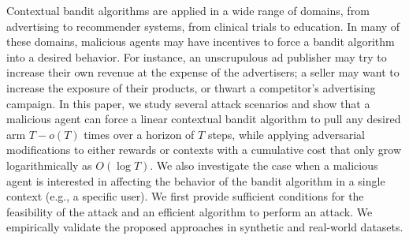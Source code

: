 \newcommand{\mtb}[1]{\textcolor{black}{#1}}
\newcommand{\otc}[1]{\textcolor{black}{#1}}
\newcommand{\changede}[1]{\textcolor{black}{#1}}
\newcommand{\changebr}[1]{\textcolor{black}{#1}}
\newcommand{\changelm}[1]{\textcolor{black}{#1}}
\newcommand{\changebrtwo}[1]{\textcolor{black}{#1}}
\newcommand{\changee}[1]{\textcolor{black}{#1}}
\newcommand{\cmmnt}[1]{\ignorespaces}


Contextual bandit algorithms are applied in a wide range of domains, from advertising to recommender systems, from clinical trials to education. In many of these domains, malicious agents may have incentives to {force a bandit algorithm into a desired behavior.} %
For instance, an unscrupulous ad publisher may try to increase their own revenue at the expense of the advertisers; a seller may want to increase the exposure of their products, or thwart a competitor's advertising campaign.
In this paper, we study several attack scenarios and show that a malicious agent can force a linear contextual bandit algorithm to pull any desired arm $T - o(T)$ times over a horizon of $T$ steps, while applying adversarial modifications to either rewards or contexts {with a cumulative cost} that only grow logarithmically as $O(\log T)$.
We also investigate the case when a malicious agent is interested in affecting the behavior of the bandit algorithm in a single context (e.g., a specific user). We first provide sufficient conditions for the feasibility of the attack and %
an efficient algorithm to perform an attack. %
{We empirically validate the proposed approaches in synthetic and real-world datasets.} %














\begin{subappendices}






\end{subappendices}

